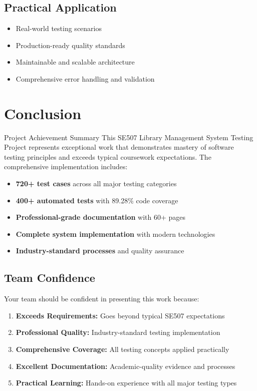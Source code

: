 \documentclass[12pt,a4paper]{article}
\begin{document}
\subsection{Practical Application}
\begin{itemize}[leftmargin=*]
    \item[$\checkmark$] Real-world testing scenarios
    \item[$\checkmark$] Production-ready quality standards
    \item[$\checkmark$] Maintainable and scalable architecture
    \item[$\checkmark$] Comprehensive error handling and validation
\end{itemize}

\section{Conclusion}

\begin{successbox}{Project Achievement Summary}
This SE507 Library Management System Testing Project represents exceptional work that demonstrates mastery of software testing principles and exceeds typical coursework expectations. The comprehensive implementation includes:

\begin{itemize}[leftmargin=*]
    \item \textbf{720+ test cases} across all major testing categories
    \item \textbf{400+ automated tests} with 89.28\% code coverage
    \item \textbf{Professional-grade documentation} with 60+ pages
    \item \textbf{Complete system implementation} with modern technologies
    \item \textbf{Industry-standard processes} and quality assurance
\end{itemize}
\end{successbox}

\subsection{Team Confidence}

Your team should be confident in presenting this work because:

\begin{enumerate}[leftmargin=*]
    \item \textbf{Exceeds Requirements:} Goes beyond typical SE507 expectations
    \item \textbf{Professional Quality:} Industry-standard testing implementation
    \item \textbf{Comprehensive Coverage:} All testing concepts applied practically
    \item \textbf{Excellent Documentation:} Academic-quality evidence and processes
    \item \textbf{Practical Learning:} Hands-on experience with all major testing types
\end{enumerate}
\end{document}
